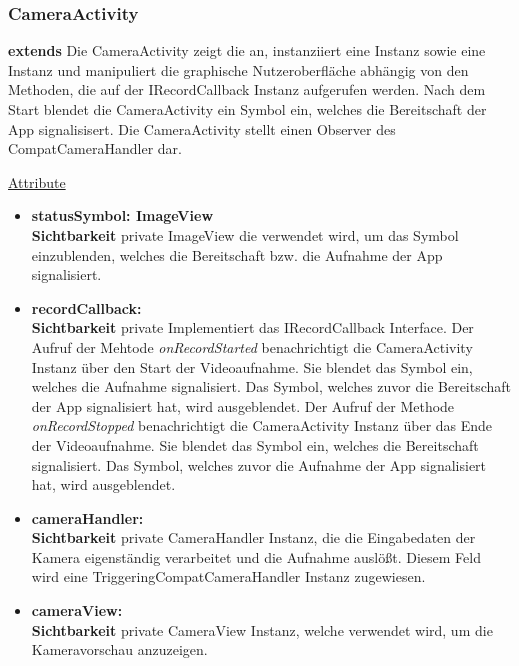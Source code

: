 \subsubsection{CameraActivity} \label{app:klasse:CameraActivity}
\textbf{extends}  \newline
Die CameraActivity zeigt die  an, instanziiert eine  Instanz sowie eine  Instanz und manipuliert die graphische Nutzeroberfläche abhängig von den Methoden, die auf der IRecordCallback Instanz aufgerufen werden. Nach dem Start blendet die CameraActivity ein Symbol ein, welches die Bereitschaft der App signalisisert. Die CameraActivity stellt einen Observer des CompatCameraHandler dar.
\newline

\underline{Attribute}
\begin{itemize}
\itemsep0pt

\item \textbf{statusSymbol: ImageView} \hfill\\ 
\textbf{Sichtbarkeit} private\newline
ImageView die verwendet wird, um das Symbol einzublenden, welches die Bereitschaft bzw. die Aufnahme der App signalisiert.

\item \textbf{recordCallback: } \hfill\\ 
\textbf{Sichtbarkeit} private\newline
Implementiert das IRecordCallback Interface. 
Der Aufruf der Mehtode \textit{onRecordStarted} benachrichtigt die CameraActivity Instanz über den Start der Videoaufnahme. Sie blendet das Symbol ein, welches die Aufnahme signalisiert. Das Symbol, welches zuvor die Bereitschaft der App signalisiert hat, wird ausgeblendet.
Der Aufruf der Methode \textit{onRecordStopped} benachrichtigt die CameraActivity Instanz über das Ende der Videoaufnahme. Sie blendet das Symbol ein, welches die Bereitschaft signalisiert. Das Symbol, welches zuvor die Aufnahme der App signalisiert hat, wird ausgeblendet.

\item \textbf{cameraHandler: } \hfill\\ 
\textbf{Sichtbarkeit} private\newline
CameraHandler Instanz, die die Eingabedaten der Kamera eigenständig verarbeitet und die Aufnahme auslößt. Diesem Feld wird eine TriggeringCompatCameraHandler Instanz zugewiesen.

\item \textbf{cameraView: } \hfill\\ 
\textbf{Sichtbarkeit} private\newline
CameraView Instanz, welche verwendet wird, um die Kameravorschau anzuzeigen.

\end{itemize}

